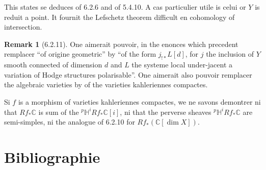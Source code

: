 \documentclass[12pt,a4paper]{article}
\theoremstyle{plain}
\theoremstyle{definition}
\newtheorem{remark}[theorem]{Remark}
\theoremstyle{remark}
\newcommand{\CC}{\mathbb{C}}
\newcommand{\HH}{\mathbb{H}}
\begin{document}
This states se deduces of 6.2.6 and of 5.4.10. A cas particulier utile is celui or $Y$ is reduit a point. It fournit the Lefschetz theorem difficult en cohomology of intersection.

\begin{remark}[6.2.11]
One aimerait pouvoir, in the enonces which precedent remplacer ``of origine geometric'' by ``of the form $j_{!*}L[d]$, for $j$ the inclusion of $Y$ smooth connected of dimension $d$ and $L$ the systeme local under-jacent a variation of Hodge structures polarisable''. One aimerait also pouvoir remplacer the algebraic varieties by of the varieties kahleriennes compactes.

Si $f$ is a morphism of varieties kahleriennes compactes, we ne savons demontrer ni that $Rf_*\CC$ is sum of the ${}^{p}\HH^iRf_*\CC[i]$, ni that the perverse sheaves ${}^{p}\HH^iRf_*\CC$ are semi-simples, ni the analogue of 6.2.10 for $Rf_*(\CC[\dim X])$.
\end{remark}

\newpage
\section*{Bibliographie}
\end{document}
